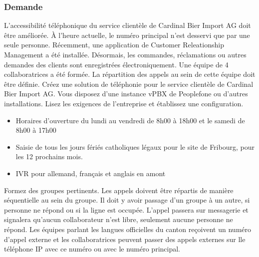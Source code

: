 \documentclass[letterpaper,10pt,french]{sphinxmanual}
\begin{document}
\subsubsection{Demande}
\label{\detokenize{Documentation-M362:demande}}
\sphinxAtStartPar
{}

\sphinxAtStartPar
L’accessibilité téléphonique du service clientèle de Cardinal Bier Import AG doit être améliorée. À l’heure actuelle, le numéro principal n’est desservi que par une seule personne. Récemment, une application de Customer Releationship Management a été installée. Désormais, les commandes, réclamations ou autres demandes des clients sont enregistrées électroniquement. Une équipe de 4 collaboratrices a été formée. La répartition des appels au sein de cette équipe doit être définie. Créez une solution de téléphonie pour le service clientèle de Cardinal Bier Import AG. Vous disposez d’une instance vPBX de Peoplefone ou d’autres installations. Lisez les exigences de l’entreprise et établissez une configuration.

\sphinxAtStartPar
{}

\sphinxAtStartPar

\begin{itemize}
\item {} 
\sphinxAtStartPar
Horaires d’ouverture du lundi au vendredi de 8h00 à 18h00 et le samedi de 8h00 à 17h00

\item {} 
\sphinxAtStartPar
Saisie de tous les jours fériés catholiques légaux pour le site de Fribourg, pour les 12 prochains mois.

\item {} 
\sphinxAtStartPar
IVR pour allemand, français et anglais en amont

\end{itemize}

\sphinxAtStartPar
Formez des groupes pertinents. Les appels doivent être répartis de manière séquentielle au sein du groupe. Il doit y avoir passage d’un groupe à un autre, si personne ne répond ou si la ligne est occupée. L’appel passera sur messagerie et signalera qu’aucun collaborateur n’est libre, seulement aucune personne ne répond. Les équipes parlant les langues officielles du canton reçoivent un numéro d’appel externe et les collaboratrices peuvent passer des appels externes sur lle téléphone IP avec ce numéro ou avec le numéro principal.
\end{document}
